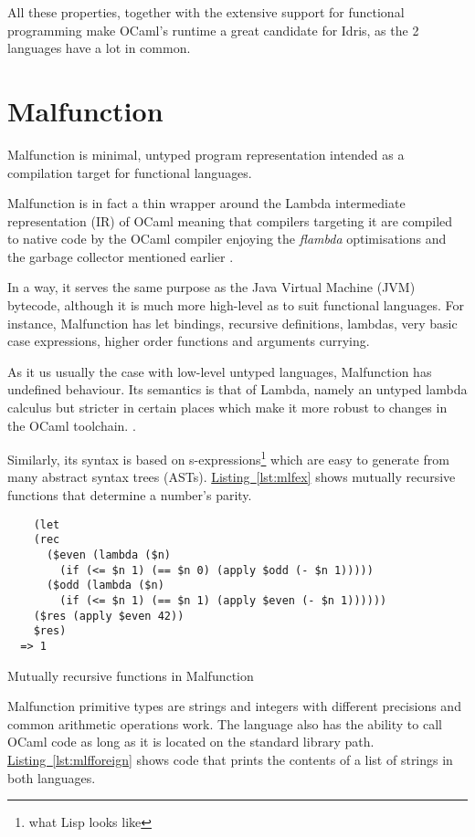 All these properties, together with the extensive support
for functional programming make OCaml's runtime a great
candidate for Idris, as the 2 languages have a lot in common.

\section{Malfunction}
Malfunction is minimal, untyped program representation intended as a
compilation target for functional languages.

Malfunction is in fact a thin wrapper around the Lambda intermediate
representation (IR) of OCaml meaning that compilers targeting it
are compiled to native code by the OCaml compiler enjoying the
\emph{flambda} optimisations and the garbage collector mentioned
earlier \citep{dolan2016malfunctional}.

In a way, it serves the same purpose as the Java Virtual Machine (JVM)
bytecode, although it is much more high-level as
to suit functional languages. For instance, Malfunction has
let bindings, recursive definitions, lambdas, very basic case
expressions, higher order functions and arguments currying.

As it us usually the case with low-level untyped languages, Malfunction
has undefined behaviour.
Its semantics is that of Lambda, namely an untyped lambda calculus but
stricter in certain places which make it more robust to changes in the
OCaml toolchain.
\citep{dolan2016malfunctional}.

Similarly, its syntax is based on s-expressions\footnote{
    what Lisp looks like
} which are easy to generate from many abstract syntax trees (ASTs).
\hyperref[lst:mlfex]{Listing~\ref{lst:mlfex}} shows mutually recursive
functions that determine a number's parity.


\begin{listing}
    \begin{verbatim}
    (let
    (rec
      ($even (lambda ($n) 
        (if (<= $n 1) (== $n 0) (apply $odd (- $n 1)))))
      ($odd (lambda ($n) 
        (if (<= $n 1) (== $n 1) (apply $even (- $n 1))))))
    ($res (apply $even 42))
    $res)
  => 1
  \end{verbatim}
    \caption{Mutually recursive functions in Malfunction}
    \label{lst:mlfex}
\end{listing}

Malfunction primitive types are strings and integers with
different precisions and common arithmetic operations
work. The language also has the ability to call OCaml code as long
as it is located on the standard library path.
\hyperref[lst:mlfforeign]{Listing~\ref{lst:mlfforeign}}
shows code that prints the contents of a list of strings in both
languages.

